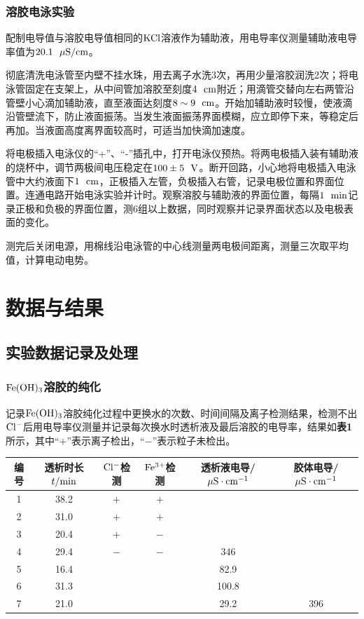 \documentclass[12pt]{article}
\begin{document}
			\subsubsection{溶胶电泳实验}
配制电导值与溶胶电导值相同的$\rm KCl$溶液作为辅助液，用电导率仪测量辅助液电导率值为$20.1\ \ {\rm \mu S/cm}$。\par 
彻底清洗电泳管至内壁不挂水珠，用去离子水洗3次，再用少量溶胶润洗2次；将电泳管固定在支架上，从中间管加溶胶至刻度$\rm 4\ \ cm$附近；用滴管交替向左右两管沿管壁小心滴加辅助液，直至液面达刻度$\rm 8\sim 9\ \ cm$。开始加辅助液时较慢，使液滴沿管壁流下，防止液面振荡。当发生液面振荡界面模糊，应立即停下来，等稳定后再加。当液面高度离界面较高时，可适当加快滴加速度。\par 
将电极插入电泳仪的“+”、“-”插孔中，打开电泳仪预热。将两电极插入装有辅助液的烧杯中，调节两极间电压稳定在$\rm 100\pm 5\ \ V$。断开回路，小心地将电极插入电泳管中大约液面下$1\ \ \rm cm$，正极插入左管，负极插入右管，记录电极位置和界面位置。连通电路开始电泳实验并计时。观察溶胶与辅助液的界面位置，每隔$\rm 1\ \ min$记录正极和负极的界面位置，测6组以上数据，同时观察并记录界面状态以及电极表面的变化。\par 
测完后关闭电源，用棉线沿电泳管的中心线测量两电极间距离，测量三次取平均值，计算电动电势。
\vbox{}
 \section{数据与结果}
 \subsection{实验数据记录及处理}
 \subsubsection{$\rm Fe(OH)_{3}$溶胶的纯化}
 记录$\rm Fe(OH)_{3}$溶胶纯化过程中更换水的次数、时间间隔及离子检测结果，检测不出$\rm Cl^{-}$后用电导率仪测量并记录每次换水时透析液及最后溶胶的电导率，结果如\textbf{表1}所示，其中“$+$”表示离子检出，“$-$”表示粒子未检出。
 \begin{table}[h]
 	\centering
 	\begin{tabular}{cccccc}
 		\toprule
 		编号 & 透析时长$t/{\rm min}$ & ${\rm Cl^{-}}$检测 & ${\rm Fe^{3+}}$检测 & 透析液电导/${\rm \mu S\cdot cm^{-1}}$ & 胶体电导/${\rm \mu S\cdot cm^{-1}}$  \\
 		\midrule
 		1 & 38.2 & $+$ & $+$ &  & \\
 		2 & 31.0 & $+$ & $+$ &  &\\
 		3 & 20.4 & $+$ & $-$ &  &\\
 		4 & 29.4 & $-$ & $-$ & 346 &\\
 		5 & 16.4 &  &  & 82.9 &\\
 		6 & 31.3 &  &  & 100.8 &\\
 		7 & 21.0 &  &  & 29.2 & 396\\
 		\bottomrule
 	\end{tabular}
 \end{table}
 \par
\end{document}
